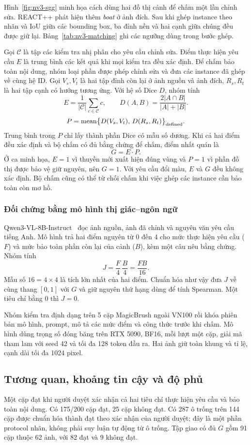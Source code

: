 Hình~\ref{fig:nv3-sgg} minh họa cách dùng hai đồ thị cảnh để chấm một lần chỉnh sửa.
REACT++ phát hiện thêm \textit{boat} ở ảnh đích. Sau khi ghép instance theo
nhãn và IoU giữa các bounding box, ba đỉnh nền và hai cạnh giữa chúng đều
được giữ lại. Bảng~\ref{tab:nv3-matching} ghi các ngưỡng dùng trong bước ghép.

Gọi $\mathcal C$ là tập các kiểm tra nhị phân cho yêu cầu chỉnh sửa. Điểm
thực hiện yêu cầu $E$ là trung bình các kết quả khi mọi kiểm tra đều xác định.
Để chấm bảo toàn nội dung, nhóm loại phần được phép chỉnh sửa và đưa các instance
đã ghép về cùng hệ ID. Gọi $V_s,V_t$ là hai tập đỉnh còn lại ở ảnh nguồn
và ảnh đích, $R_s,R_t$ là hai tập cạnh có hướng tương ứng. Với hệ số Dice
$D$, nhóm tính
\[
E = \frac{1}{|\mathcal C|}\sum_{c\in\mathcal C} c, \qquad
D(A,B) = \frac{2|A\cap B|}{|A|+|B|}.
\]
\[
P = \operatorname{mean}\bigl\{D(V_s,V_t),\,D(R_s,R_t)\bigr\}_{\rm defined}.
\]
Trung bình trong $P$ chỉ lấy thành phần Dice có mẫu số dương. Khi cả hai
điểm đều xác định và bộ chấm có đủ bằng chứng để chấm, điểm nhất quán là
\[
G = E \cdot P.
\]
Ở ca minh họa, $E=1$ vì thuyền mới xuất hiện đúng vùng và $P=1$ vì phần đồ thị
được bảo vệ giữ nguyên, nên $G=1$. Với yêu cầu đổi màu, $E$ và $G$ đều
không xác định. Bộ chấm cũng có thể từ chối chấm khi việc ghép các instance
cần bảo toàn còn mơ hồ.

\subsubsection{Đối chứng bằng mô hình thị giác--ngôn ngữ}
Qwen3-VL-8B-Instruct~\cite{qwen3VLinstruct} đọc ảnh nguồn, ảnh đã chỉnh và nguyên văn yêu cầu tiếng Anh. Mô hình trả hai điểm nguyên từ 0 đến 4 cho mức thực hiện yêu cầu ($F$) và mức bảo toàn phần còn lại của cảnh ($B$), kèm một câu nêu bằng chứng. Nhóm tính
\[
J=\frac{F}{4}\,\frac{B}{4}=\frac{F B}{16}.
\]
Mẫu số $16=4\times4$ là tích lớn nhất của hai điểm. Chuẩn hóa như vậy đưa $J$ về cùng thang $[0,1]$ với $G$ và giữ nguyên thứ hạng dùng để tính Spearman. Một tiêu chí bằng 0 thì $J=0$.

Nhóm kiểm tra định dạng trên 5 cặp MagicBrush ngoài VN100 rồi khóa phiên bản mô hình, prompt, mô tả các mức điểm và công thức trước khi chấm. Mô hình dùng trọng số đóng băng trên RTX 5090, BF16, mỗi lượt một cặp, giải mã tham lam với seed 42 và tối đa 128 token đầu ra. Hai ảnh giữ toàn khung và tỉ lệ, cạnh dài tối đa 1024 pixel.

\subsection{Tương quan, khoảng tin cậy và độ phủ}
Một cặp đạt khi người duyệt xác nhận cả hai tiêu chí thực hiện yêu cầu và bảo toàn nội dung. Có 175/200 cặp đạt, 25 cặp không đạt.
Có 287 ô trống trên 144 cặp được chuẩn hóa thành đạt theo xác nhận của người duyệt;
đây là một phần protocol nhãn, không phải suy luận tự động từ ô trống.
Tập giao có đủ $G$ gồm 91 cặp thuộc 62 ảnh, với 82 đạt và 9 không đạt.

